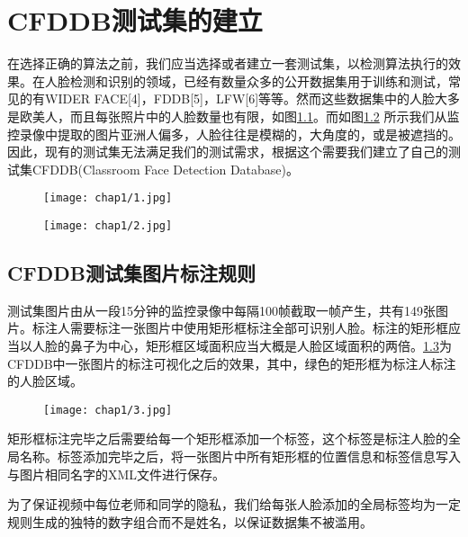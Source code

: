 \chapter{CFDDB测试集的建立}
\label{chap:establishCFDDB}

在选择正确的算法之前，我们应当选择或者建立一套测试集，以检测算法执行的效果。在人脸检测和识别的领域，已经有数量众多的公开数据集用于训练和测试，常见的有WIDER FACE[4]，FDDB[5]，LFW[6]等等。然而这些数据集中的人脸大多是欧美人，而且每张照片中的人脸数量也有限，如图\ref{fig:chap1:picfromwider}。而如图\ref{fig:chap1:picfromcfddb} 所示我们从监控录像中提取的图片亚洲人偏多，人脸往往是模糊的，大角度的，或是被遮挡的。因此，现有的测试集无法满足我们的测试需求，根据这个需要我们建立了自己的测试集CFDDB(Classroom Face Detection Database)。

\begin{figure}[!htp]
	\centering
	\texttt{[image: chap1/1.jpg]}
	\label{fig:chap1:picfromwider}
\end{figure}

\begin{figure}[!htp]
	\centering
	\texttt{[image: chap1/2.jpg]}
	\label{fig:chap1:picfromcfddb}
\end{figure}


\section{CFDDB测试集图片标注规则}

测试集图片由从一段15分钟的监控录像中每隔100帧截取一帧产生，共有149张图片。标注人需要标注一张图片中使用矩形框标注全部可识别人脸。标注的矩形框应当以人脸的鼻子为中心，矩形框区域面积应当大概是人脸区域面积的两倍。\ref{fig:chap1:cfddblbexp}为CFDDB中一张图片的标注可视化之后的效果，其中，绿色的矩形框为标注人标注的人脸区域。

\begin{figure}[!htp]
	\centering
	\texttt{[image: chap1/3.jpg]}
	\label{fig:chap1:cfddblbexp}
\end{figure}

矩形框标注完毕之后需要给每一个矩形框添加一个标签，这个标签是标注人脸的全局名称。标签添加完毕之后，将一张图片中所有矩形框的位置信息和标签信息写入与图片相同名字的XML文件进行保存。

为了保证视频中每位老师和同学的隐私，我们给每张人脸添加的全局标签均为一定规则生成的独特的数字组合而不是姓名，以保证数据集不被滥用。

